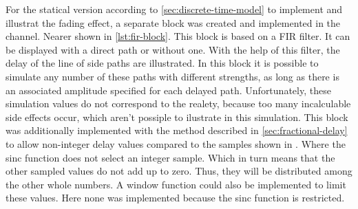 For the statical version according to \ref{sec:discrete-time-model} to implement and illustrat the fading effect, a separate block was created and implemented in the channel. Nearer shown in \ref{lst:fir-block}. This block is based on a FIR filter. It can be displayed with a direct path or without one. With the help of this filter, the delay of the line of side paths are illustrated. In this block it is possible to simulate any number of these paths with different strengths, as long as there is an associated amplitude specified for each delayed path. Unfortunately, these simulation values do not correspond to the realety, because too many incalculable side effects occur, which aren't possiple to ilustrate in this simulation.
This block was additionally implemented with the method described in \ref{sec:fractional-delay} to allow non-integer delay values compared to the samples shown in . Where the sinc function does not select an integer sample. Which in turn means that the other sampled values do not add up to zero.
Thus, they will be distributed among the other whole numbers. A window function could also be implemented to limit these values. Here none was implemented because the sinc function is restricted.



